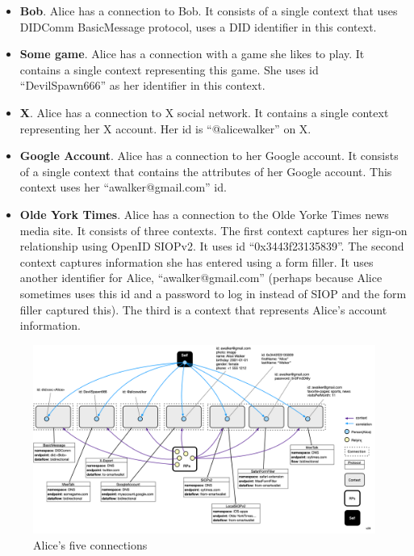 \documentclass[11pt, oneside]{article}   	%
\begin{document}
\begin{itemize}
	\item \textbf{Bob}. Alice has a connection to Bob. It consists of a single context that uses DIDComm BasicMessage protocol, uses a DID identifier in this context.
	\item \textbf{Some game}. Alice has a connection with a game she likes to play. It contains a single context representing this game. She uses id ``DevilSpawn666'' as her identifier in this context.  
	\item \textbf{X}. Alice has a connection to X social network. It contains a single context representing her X account. Her id is ``@alicewalker'' on X.
	\item \textbf{Google Account}. Alice has a connection to her Google account. It consists of a single context that contains the attributes of her Google account. This context uses her ``awalker@gmail.com'' id. 
	\item \textbf{Olde York Times}. Alice has a connection to the Olde Yorke Times news media site. It consists of three contexts. The first context captures her sign-on relationship using OpenID SIOPv2. It uses id ``0x3443f23135839''. The second context captures information she has entered using a form filler. It uses another identifier for Alice, ``awalker@gmail.com'' (perhaps because Alice sometimes uses this id and a password to log in instead of SIOP and the form filler captured this). The third is a context that represents Alice's account information. 
\end{itemize}

\begin{figure}[htbp]
\includegraphics[width=\textwidth]{./images/multiple-connections.png}
\caption{Alice's five connections}
\label{fig:groups}
\end{figure}
\end{document}
